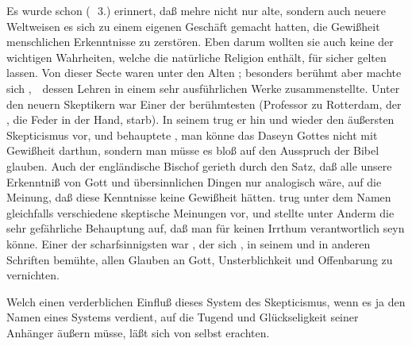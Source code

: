 Es wurde schon (\ \no\,3.) erinnert, daß mehre nicht nur alte, sondern auch neuere Weltweisen es sich zu einem eigenen Geschäft gemacht hatten, die Gewißheit  menschlichen Erkenntnisse zu zerstören. Eben darum wollten sie auch keine der wichtigen Wahrheiten, welche die natürliche Religion enthält, für sicher gelten lassen. Von dieser Secte waren unter den Alten ; besonders berühmt aber machte sich ,~\ dessen Lehren  in einem sehr ausführlichen Werke zusammenstellte. Unter den neuern Skeptikern war Einer der berühmtesten  (Professor zu Rotterdam, der , die Feder in der Hand, starb). In seinem  trug er hin und wieder den äußersten Skepticismus vor, und behauptete \zB , man könne das Daseyn Gottes nicht mit Gewißheit darthun, sondern man müsse es bloß auf den Ausspruch der Bibel glauben. Auch der engländische Bischof  gerieth durch den Satz, daß alle unsere Erkenntniß von Gott und übersinnlichen Dingen nur analogisch wäre, auf die Meinung, daß diese Kenntnisse keine Gewißheit hätten.  trug unter dem Namen  gleichfalls verschiedene skeptische Meinungen vor, und stellte unter Anderm die sehr gefährliche Behauptung auf, daß man für keinen Irrthum verantwortlich seyn könne. Einer der scharfsinnigsten war , der sich , in seinem  und in anderen Schriften bemühte, allen Glauben an Gott, Unsterblichkeit und Offenbarung zu vernichten.\par
Welch einen verderblichen Einfluß dieses System des Skepticismus, wenn es ja den Namen eines Systems verdient, auf die Tugend und Glückseligkeit seiner Anhänger äußern müsse, läßt sich von selbst erachten.
   
